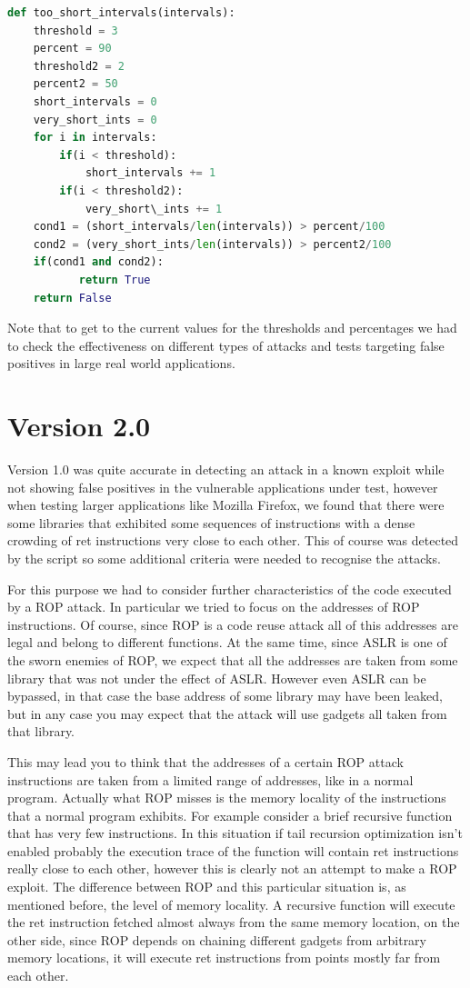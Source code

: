\documentclass[Lau,binding=0.6cm]{sapthesis}
\begin{document}
\begin{lstlisting}[language=Python]
def too_short_intervals(intervals):
    threshold = 3
    percent = 90
    threshold2 = 2
    percent2 = 50
    short_intervals = 0
    very_short_ints = 0
    for i in intervals:
        if(i < threshold):
            short_intervals += 1
        if(i < threshold2):
            very_short\_ints += 1
    cond1 = (short_intervals/len(intervals)) > percent/100
    cond2 = (very_short_ints/len(intervals)) > percent2/100
    if(cond1 and cond2):
           return True
    return False
\end{lstlisting}

Note that to get to the current values for the thresholds and percentages we had to check the effectiveness on different types of attacks and tests targeting false positives in large real world applications.

\section{Version 2.0}

Version 1.0 was quite accurate in detecting an attack in a known exploit while not showing false positives in the vulnerable applications under test, however when testing larger applications like Mozilla Firefox, we found that there were some libraries that exhibited some sequences of instructions with a dense crowding of ret instructions very close to each other. This of course was detected by the script so some additional criteria were needed to recognise the attacks. 


For this purpose we had to consider further characteristics of the code executed by a ROP attack. In particular we tried to focus on the addresses of ROP instructions. Of course, since ROP is a code reuse attack all of this addresses are legal and belong to different functions. At the same time, since ASLR is one of the sworn enemies of ROP, we expect that all the addresses are taken from some library that was not under the effect of ASLR. However even ASLR can be bypassed, in that case the base address of some library may have been leaked, but in any case you may expect that the attack will use gadgets all taken from that library.


This may lead you to think that the addresses of a certain ROP attack instructions are taken from a limited range of addresses, like in a normal program. Actually what ROP misses is the memory locality of the instructions that a normal program exhibits. For example consider a brief recursive function that has very few instructions. In this situation if tail recursion optimization isn’t enabled probably the execution trace of the function will contain ret instructions really close to each other, however this is clearly not an attempt to make a ROP exploit. The difference between ROP and this particular situation is, as mentioned before, the level of memory locality. A recursive function will execute the ret instruction fetched almost always from the same memory location, on the other side, since ROP depends on chaining different gadgets from arbitrary memory locations, it will execute ret instructions from points mostly far from each other.
\end{document}
